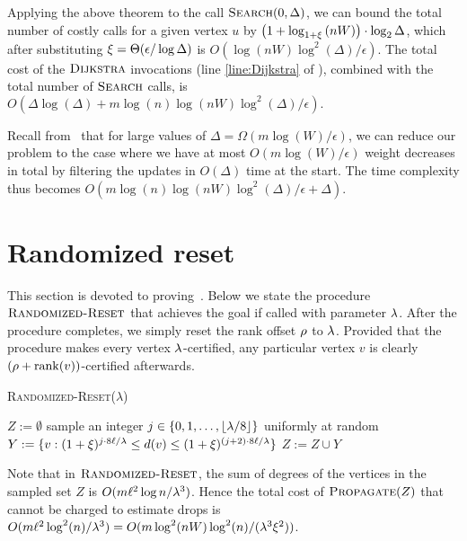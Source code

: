 \documentclass[11pt,letterpaper]{article}
\theoremstyle{plain}
\renewcommand{\O}{O}
\newcommand{\eps}{\ensuremath{\epsilon}}
\DeclareMathOperator*{\rank}{rank}
\DeclareMathOperator*{\PD}{\textsc{Propagate}}
\begin{document}
Applying the above theorem to the call $\textproc{Search}(0, \Delta)$, we can bound the total number of costly calls for a given vertex $u$ by
$\left(1 + \log_{1 + \xi}\left(nW\right)\right) \cdot \log_2 \Delta$, which after substituting 
$\epsp=\Theta(\eps/\log\Delta)$ is 
$\O(\log(nW) \log^2(\Delta) / \eps)$.
The total cost of the $\textproc{Dijkstra}$ invocations (line \ref{line:Dijkstra} of ), combined with the total number of $\textproc{Search}$ calls, is
$\O(\Delta \log(\Delta) + m \log(n)\log(nW) \log^2(\Delta) / \eps).$

Recall from~ that for large values of $\Delta = \Omega(m \log(W)/\eps)$, we can reduce our problem to the case where we have at most $\O(m \log(W)/\eps)$ weight decreases in total by filtering the updates in $\O(\Delta)$ time at the start.
The time complexity thus becomes
$\O(m \log(n)\log(nW)\log^2(\Delta) / \eps + \Delta)$.

\section{Randomized reset}\label{a:reset}
This section is devoted to proving~.
Below we state the procedure $\textsc{Randomized-Reset}$ that achieves the goal if called with parameter $\lambda$.
After the procedure completes, we simply reset the rank offset $\rho$ to $\lambda$.
Provided that the procedure makes every vertex $\lambda$-certified, any particular vertex $v$ is clearly
$(\roff+\rank(v))$-certified afterwards.

\begin{algorithm}[h!]
  \caption{\textsc{Randomized-Reset}($\lambda$)}\label{alg:batch-update}
  \begin{algorithmic}[1]
    \State $Z:=\emptyset$
      \State sample an integer $j\in \{0,1,\ldots,\lfloor \lambda/8\rfloor\}$ uniformly at random
      \State $Y:=\{v:(1+\xi)^{j\cdot 8\ell/\lambda}\leq d(v)\leq (1+\xi)^{(j+2)\cdot 8\ell/\lambda}\}$ \Comment{compute $Y$ only if $\deg(Y)=\O(m\ell/\bal^2)$}
        \State $Z:=Z\cup Y$
      \EndIf
    \EndFor
    \State {}
  \end{algorithmic}
\end{algorithm}
Note that in $\textsc{Randomized-Reset}$,
the sum of degrees of the vertices in the sampled set $Z$ is $\O(m\ell^2\log{n}/\bal^3)$.
Hence the total cost of $\PD(Z)$ that cannot be charged to estimate drops
is $\O(m\ell^2\log^2(n)/\bal^3)=\O(m\log^2(nW)\log^2(n)/(\bal^3\epsp^2))$.
\end{document}
